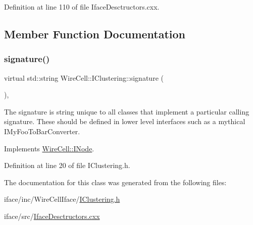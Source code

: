 Definition at line 110 of file Iface\+Desctructors.\+cxx.



\subsection{Member Function Documentation}
\mbox{\label{class_wire_cell_1_1_i_clustering_af2961973301a8026eb74caa78937097a}} 
\subsubsection{\texorpdfstring{signature()}{signature()}}
{\footnotesize\ttfamily virtual std\+::string Wire\+Cell\+::\+I\+Clustering\+::signature (\begin{DoxyParamCaption}{ }\end{DoxyParamCaption})\hspace{0.3cm}{\ttfamily [inline]}, {\ttfamily [virtual]}}

The signature is string unique to all classes that implement a particular calling signature. These should be defined in lower level interfaces such as a mythical I\+My\+Foo\+To\+Bar\+Converter. 

Implements \hyperlink{class_wire_cell_1_1_i_node_a0b0763465adf5ba7febe8e378162b584}{Wire\+Cell\+::\+I\+Node}.



Definition at line 20 of file I\+Clustering.\+h.



The documentation for this class was generated from the following files\+:\begin{DoxyCompactItemize}
\item 
iface/inc/\+Wire\+Cell\+Iface/\hyperlink{_i_clustering_8h}{I\+Clustering.\+h}\item 
iface/src/\hyperlink{_iface_desctructors_8cxx}{Iface\+Desctructors.\+cxx}\end{DoxyCompactItemize}
